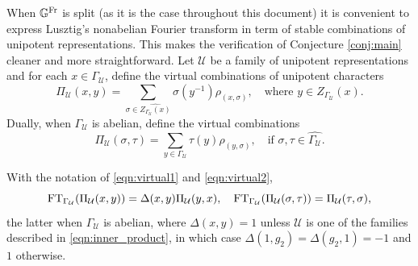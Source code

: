 When $\mathbb{G}^{\mathrm{Fr}}$ is split (as it is the case throughout this document) it is convenient to express Lusztig's nonabelian Fourier transform in term of stable combinations of unipotent representations. This makes the verification of Conjecture \ref{conj:main} cleaner and more straightforward. Let $\mathcal{U}$ be a family of unipotent representations and for each $x\in\Gamma_\mathcal{U}$, define the virtual combinations of unipotent characters
\begin{equation}\label{eqn:virtual1}
    \Pi_\mathcal{U}(x,y)=\sum_{\sigma\in\widehat{Z_{\Gamma_\mathcal{U}}(x)}}\sigma(y^{-1})\rho_{(x,\sigma)},\quad\text{where } y\in Z_{\Gamma_\mathcal{U}}(x).
\end{equation}
Dually, when $\Gamma_\mathcal{U}$ is abelian, define the virtual combinations
\begin{equation}\label{eqn:virtual2}
    \Pi_\mathcal{U}(\sigma,\tau)=\sum_{y\in\Gamma_\mathcal{U}}\tau(y)\rho_{(y,\sigma)},\quad\text{if } \sigma,\tau\in \widehat{\Gamma_\mathcal{U}}.
\end{equation}


\begin{lemma}
    With the notation of \eqref{eqn:virtual1} and \eqref{eqn:virtual2}, 
    \begin{equation*}
        \mathrm{FT}_{\Gamma_\mathcal{U}}(\Pi_\mathcal{U}(x,y))=\Delta(x,y)\Pi_{\mathcal{U}}(y,x),\quad \mathrm{FT}_{\Gamma_\mathcal{U}}(\Pi_\mathcal{U}(\sigma,\tau))=\Pi_{\mathcal{U}}(\tau,\sigma),
    \end{equation*}
    the latter when $\Gamma_\mathcal{U}$ is abelian, where $\Delta(x,y)=1$ unless $\mathcal{U}$ is one of the families described in \eqref{eqn:inner_product}, in which case $\Delta(1,g_2)=\Delta(g_2,1)=-1$ and $1$ otherwise.
\end{lemma}

\newpage
